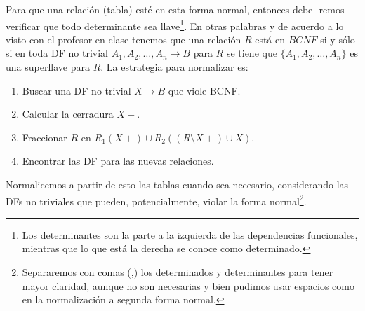 \documentclass[11pt,letterpaper]{article}
\begin{document}
Para que una relación (tabla) esté en esta forma normal, entonces debe-
remos verificar que todo determinante sea llave\footnote{Los determinantes son la parte a la izquierda de las dependencias funcionales, mientras que lo que está la derecha se conoce como determinado.}. En otras palabras y de acuerdo a lo visto con el profesor en clase
tenemos que una relación $R$ está en $BCNF$ si y sólo si en toda DF no trivial $A_1,A_2,\dots, A_n \rightarrow B$ para $R$ se tiene que $\{A_1,A_2,\dots, A_n\}$ es una superllave para $R$. La estrategia para normalizar es:

\begin{enumerate}
\item Buscar una DF no trivial $X\rightarrow B$ que viole BCNF.
\item Calcular la cerradura $X+$.
\item Fraccionar $R$ en $R_1(X+)\cup R_2((R\setminus X+)\cup X)$.
\item Encontrar las DF para las nuevas relaciones.
\end{enumerate}

Normalicemos a partir de esto las tablas cuando sea necesario, considerando las DFs no triviales que pueden, potencialmente, violar la forma normal\footnote{Separaremos con comas (,) los determinados y determinantes para tener mayor claridad, aunque no son necesarias y bien pudimos usar espacios como en la normalización a segunda forma normal.}.
\end{document}
